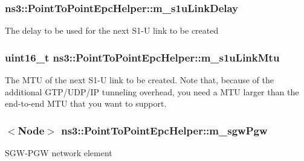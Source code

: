\subsubsection[{\texorpdfstring{m\+\_\+s1u\+Link\+Delay}{m_s1uLinkDelay}}]{ ns3\+::\+Point\+To\+Point\+Epc\+Helper\+::m\+\_\+s1u\+Link\+Delay\hspace{0.3cm}{\ttfamily [private]}}\hypertarget{classns3_1_1PointToPointEpcHelper_ab89c8a8ac200c9a7f57a86c41f8d23c2}{}\label{classns3_1_1PointToPointEpcHelper_ab89c8a8ac200c9a7f57a86c41f8d23c2}
The delay to be used for the next S1-\/U link to be created 
\subsubsection[{\texorpdfstring{m\+\_\+s1u\+Link\+Mtu}{m_s1uLinkMtu}}]{\setlength{\rightskip}{0pt plus 5cm}uint16\+\_\+t ns3\+::\+Point\+To\+Point\+Epc\+Helper\+::m\+\_\+s1u\+Link\+Mtu\hspace{0.3cm}{\ttfamily [private]}}\hypertarget{classns3_1_1PointToPointEpcHelper_a3d643e8da4aafa252b79b17246d12a7e}{}\label{classns3_1_1PointToPointEpcHelper_a3d643e8da4aafa252b79b17246d12a7e}
The M\+TU of the next S1-\/U link to be created. Note that, because of the additional G\+T\+P/\+U\+D\+P/\+IP tunneling overhead, you need a M\+TU larger than the end-\/to-\/end M\+TU that you want to support. 
\subsubsection[{\texorpdfstring{m\+\_\+sgw\+Pgw}{m_sgwPgw}}]{$<${\bf Node}$>$ ns3\+::\+Point\+To\+Point\+Epc\+Helper\+::m\+\_\+sgw\+Pgw\hspace{0.3cm}{\ttfamily [private]}}\hypertarget{classns3_1_1PointToPointEpcHelper_a4adab05b0300264e93a3a81f249dfbd8}{}\label{classns3_1_1PointToPointEpcHelper_a4adab05b0300264e93a3a81f249dfbd8}
S\+G\+W-\/\+P\+GW network element 
